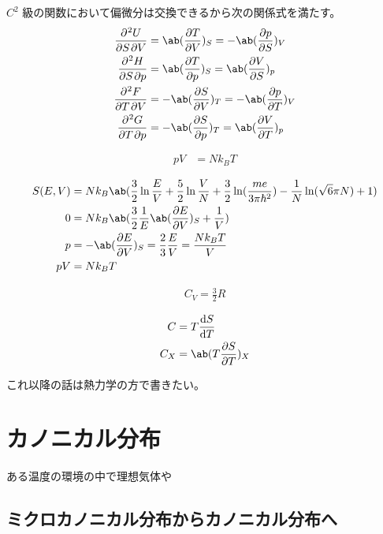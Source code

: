 \documentclass[uplatex,diffipdfmx,a4paper,11pt]{jlreq}
\numberwithin{equation}{section}
\theoremstyle{definition}
\begin{document}
\begin{theorem}
  $C^2$ 級の関数において偏微分は交換できるから次の関係式を満たす。
  \begin{align}
    \diffp{U}{S,V} & = \ab(\diffp{T}{V})_S = -\ab(\diffp{p}{S})_V  \\
    \diffp{H}{S,p} & = \ab(\diffp{T}{p})_S = \ab(\diffp{V}{S})_p   \\
    \diffp{F}{T,V} & = -\ab(\diffp{S}{V})_T = -\ab(\diffp{p}{T})_V \\
    \diffp{G}{T,p} & = -\ab(\diffp{S}{p})_T = \ab(\diffp{V}{T})_p
  \end{align}
\end{theorem}

\begin{theorem}[理想気体の状態方程式]
  \begin{align}
    pV & = Nk_BT
  \end{align}
\end{theorem}
\begin{align}
  S(E, V) & = Nk_B\ab(\frac{3}{2}\ln\frac{E}{V} + \frac{5}{2}\ln\frac{V}{N} + \frac{3}{2}\ln(\frac{me}{3\pi\hbar^2}) - \frac{1}{N}\ln(\sqrt{6}\pi N) + 1) \\
  0       & = Nk_B\ab(\frac{3}{2}\frac{1}{E}\ab(\diffp{E}{V})_S + \frac{1}{V})                                                                            \\
  p       & = -\ab(\diffp{E}{V})_S = \frac{2}{3}\frac{E}{V} = \frac{Nk_BT}{V}                                                                             \\
  pV      & = Nk_BT
\end{align}

\begin{align}
  C_V = \frac{3}{2}R
\end{align}

\begin{definition}[比熱]
  \begin{align}
    C   & = T\diff{S}{T}         \\
    C_X & = \ab(T\diffp{S}{T})_X
  \end{align}
\end{definition}
これ以降の話は熱力学の方で書きたい。

\section{カノニカル分布}
ある温度の環境の中で理想気体や
\subsection{ミクロカノニカル分布からカノニカル分布へ}
\end{document}
